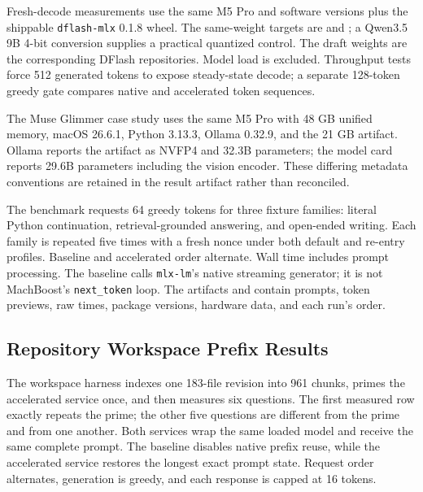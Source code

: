 \documentclass[11pt]{article}
\begin{document}
Fresh-decode measurements use the same M5 Pro and software versions plus the
shippable \texttt{dflash-mlx} 0.1.8 wheel. The same-weight targets are
 and
; a Qwen3.5 9B 4-bit conversion supplies
a practical quantized control. The draft weights are the corresponding
 DFlash repositories. Model load is excluded. Throughput tests force
512 generated tokens to expose steady-state decode; a separate 128-token greedy
gate compares native and accelerated token sequences.

The Muse Glimmer case study uses the same M5 Pro with 48 GB unified memory,
macOS 26.6.1, Python 3.13.3, Ollama 0.32.9, and the 21 GB
 artifact. Ollama reports the artifact as NVFP4 and
32.3B parameters; the model card reports 29.6B parameters including the vision
encoder. These differing metadata conventions are retained in the result
artifact rather than reconciled.

The benchmark requests 64 greedy tokens for three fixture families: literal Python continuation, retrieval-grounded answering, and open-ended writing. Each family is repeated five times with a fresh nonce under both default and re-entry profiles. Baseline and accelerated order alternate. Wall time includes prompt processing. The baseline calls \texttt{mlx-lm}'s native streaming generator; it is not MachBoost's \texttt{next\_token} loop. The artifacts  and  contain prompts, token previews, raw times, package versions, hardware data, and each run's order.

\subsection{Repository Workspace Prefix Results}
The workspace harness indexes one 183-file revision into 961 chunks, primes the
accelerated service once, and then measures six questions. The first measured
row exactly repeats the prime; the other five questions are different from the
prime and from one another. Both services wrap the same loaded model and receive
the same complete prompt. The baseline disables native prefix reuse, while the
accelerated service restores the longest exact prompt state. Request order
alternates, generation is greedy, and each response is capped at 16 tokens.
\end{document}
